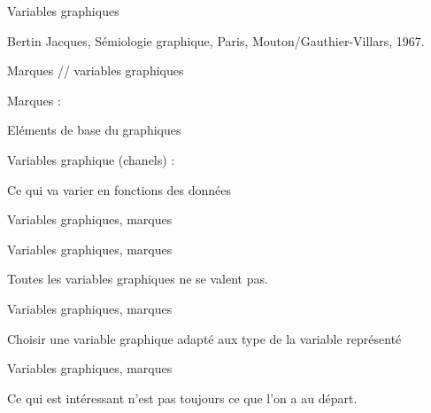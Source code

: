 \documentclass[ignorenonframetext,]{beamer}
\begin{document}
\begin{frame}{{Variables graphiques}}
\protect\hypertarget{variables-graphiques-1}{}

Bertin Jacques, Sémiologie graphique, Paris, Mouton/Gauthier-Villars,
1967.

\end{frame}

\begin{frame}{Marques // variables graphiques}
\protect\hypertarget{marques-variables-graphiques}{}

\begin{block}{Marques :}

Eléments de base du graphiques

\end{block}

\begin{block}{Variables graphique (chanels) :}

Ce qui va varier en fonctions des données

\end{block}

\end{frame}

\begin{frame}{{Variables graphiques, marques }}
\protect\hypertarget{variables-graphiques-marques}{}

\end{frame}

\begin{frame}{{Variables graphiques, marques }}
\protect\hypertarget{variables-graphiques-marques-1}{}

 Toutes les variables graphiques ne se valent pas.

\end{frame}

\begin{frame}{{Variables graphiques, marques }}
\protect\hypertarget{variables-graphiques-marques-2}{}

{Choisir une variable graphique adapté aux type de la variable
représenté}

\end{frame}

\begin{frame}{{Variables graphiques, marques }}
\protect\hypertarget{variables-graphiques-marques-3}{}

Ce qui est intéressant n'est pas toujours ce que l'on a au départ.

\end{frame}
\end{document}
